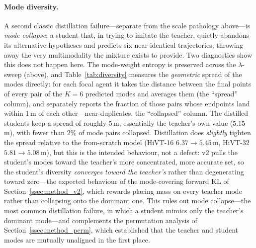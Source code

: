 \paragraph{Mode diversity.}
A second classic distillation failure---separate from the scale pathology
above---is \emph{mode collapse}: a student that, in trying to imitate the teacher,
quietly abandons its alternative hypotheses and predicts six near-identical
trajectories, throwing away the very multimodality the mixture exists to provide.
Two diagnostics show this does not happen here. The mode-weight entropy is
preserved across the $\lambda$-sweep (above), and Table~\ref{tab:diversity}
measures the \emph{geometric} spread of the modes directly: for each focal agent
it takes the distance between the final points of every pair of the $K{=}6$
predicted modes and averages them (the ``spread'' column), and separately reports
the fraction of those pairs whose endpoints land within $1$\,m of each
other---near-duplicates, the ``collapsed'' column. The distilled students keep a
spread of roughly $5$\,m, essentially the teacher's own value ($5.15$\,m), with
fewer than $2\%$ of mode pairs collapsed. Distillation does \emph{slightly}
tighten the spread relative to the from-scratch model (HiVT-16
$6.37\rightarrow5.45$\,m, HiVT-32 $5.81\rightarrow5.08$\,m), but this is the
intended behaviour, not a defect: v2 pulls the student's modes toward the
teacher's more concentrated, more accurate set, so the student's diversity
\emph{converges toward the teacher's} rather than degenerating toward zero---the
expected behaviour of the mode-covering forward KL of
Section~\ref{ssec:method_v2}, which rewards placing mass on every teacher mode
rather than collapsing onto the dominant one. This
rules out mode collapse---the most common distillation failure, in which a
student mimics only the teacher's dominant mode---and complements the permutation
analysis of Section~\ref{ssec:method_perm}, which established that the teacher and
student modes are mutually unaligned in the first place.


